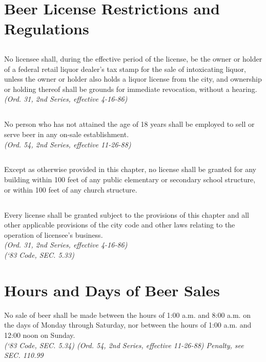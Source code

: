 \section{Beer License Restrictions and Regulations}
\subsection{}
No licensee shall, during the effective period of the license, be the owner or holder of a federal retail liquor dealer’s tax stamp for the sale of intoxicating liquor, unless the owner or holder also holds a liquor license from the city, and ownership or holding thereof shall be grounds for immediate revocation, without a hearing.\\
\emph{(Ord. 31, 2nd Series, effective 4-16-86)}
\subsection{}
No person who has not attained the age of 18 years shall be employed to sell or serve beer in any on-sale establishment.\\
\emph{(Ord. 54, 2nd Series, effective 11-26-88)}
\subsection{}
Except as otherwise provided in this chapter, no license shall be granted for any building within 100 feet of any public elementary or secondary school structure, or within 100 feet of any church structure.
\subsection{}
Every license shall be granted subject to the provisions of this chapter and all other applicable provisions of the city code and other laws relating to the operation of licensee’s business.\\
\emph{(Ord. 31, 2nd Series, effective 4-16-86)}\\
\emph{(‘83 Code, SEC. 5.33)}
\section{Hours and Days of Beer Sales}
No sale of beer shall be made between the hours of 1:00 a.m. and 8:00 a.m. on the days of Monday through Saturday, nor between the hours of 1:00 a.m. and 12:00 noon on Sunday.\\
\emph{(‘83 Code, SEC. 5.34)  (Ord. 54, 2nd Series, effective 11-26-88)  Penalty, see SEC. 110.99}

